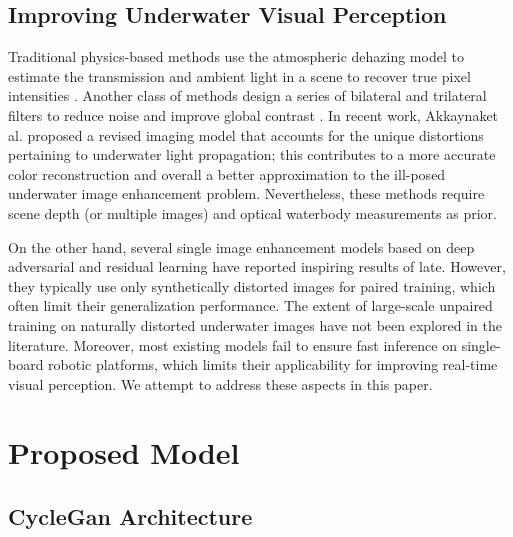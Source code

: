 \documentclass[a4paper]{article}
\begin{document}
\subsection{Improving Underwater Visual Perception}
Traditional physics-based methods use the atmospheric dehazing model to estimate the transmission and ambient light in a scene to recover true pixel intensities \cite{cho2018modelassisted, bryson2015truecolor}. Another class of methods design a series of bilateral and trilateral filters to reduce noise and improve global contrast \cite{lu2013underwaterimage, zhang2017underwaterimage}. In recent work, Akkaynaket al. \cite{akkaynak2018arevised} proposed a revised imaging model that accounts for the unique distortions pertaining to underwater light propagation; this contributes to a more accurate color reconstruction and overall a better approximation to the ill-posed underwater image enhancement problem. Nevertheless, these methods require scene depth (or multiple images) and optical waterbody measurements as prior.

On the other hand, several single image enhancement models based on deep adversarial \cite{fabbri2018enhancing, yu2019underwatergan, li2017watergan} and residual learning \cite{liu2019underwaterimage} have reported inspiring results of late. However, they typically use only synthetically distorted images for paired training, which often limit their generalization performance. The extent of large-scale unpaired training on naturally distorted underwater images have not been explored in the literature. Moreover, most existing models fail to ensure fast inference on single-board robotic platforms, which limits their applicability for improving real-time visual perception. We attempt to address these aspects in this paper.

\section{Proposed Model}
\subsection{CycleGan Architecture}
\end{document}
